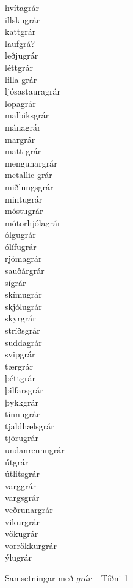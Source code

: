 \documentclass[../samsetningasafn.tex]{subfiles}
\begin{document}
\begin{bigwordlist}
\begin{footnotesize}
\begin{multicols}{4}
\begin{description}
		\item [hvítagrár]
		\item [illskugrár]
		\item [kattgrár]
		\item [laufgrá?]
		\item [leðjugrár]
		\item [léttgrár]
		\item [lilla-grár]
		\item [ljósastauragrár]
		\item [lopagrár]
		\item [malbiksgrár]
		\item [mánagrár]
		\item [margrár]
		\item [matt-grár]
		\item [mengunargrár]
		\item [metallic-grár]
		\item [miðlungsgrár]
		\item [mintugrár]
		\item [móstugrár]
		\item [mótorhjólagrár]
		\item [ólgugrár]
		\item [ólífugrár]
		\item [rjómagrár]
		\item [sauðárgrár]
		\item [sígrár]
		\item [skímugrár]
		\item [skjólugrár]
		\item [skyrgrár]
		\item [stríðsgrár]
		\item [suddagrár]
		\item [svipgrár]
		\item [tærgrár]
		\item [þéttgrár]
		\item [þilfarsgrár]
		\item [þykkgrár]
		\item [tinnugrár]
		\item [tjaldhælsgrár]
		\item [tjörugrár]
		\item [undanrennugrár]
		\item [útgrár]
		\item [útlitsgrár]
		\item [varggrár]
		\item [vargsgrár]
		\item [veðrunargrár]
		\item [vikurgrár]
		\item [vökugrár]
		\item [vorrökkurgrár]
		\item [ýlugrár]
	\end{description}
\end{multicols}
\end{footnotesize}

\label{listi:grar1}
\caption{Samsetningar með \textit{grár} -- Tíðni 1}
\end{bigwordlist}
\end{document}
